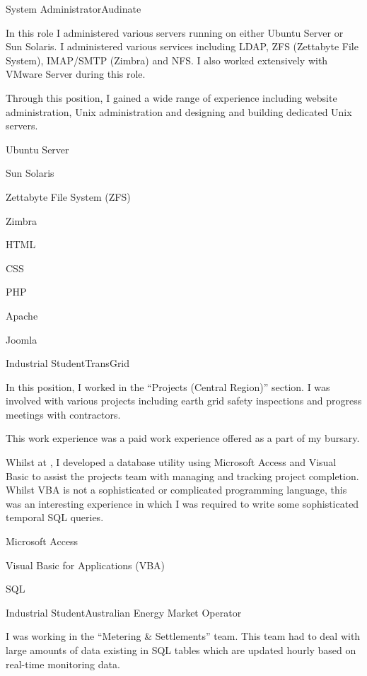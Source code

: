 \documentclass[10pt]{article}
\begin{document}
\begin{professionalExperience}
{System Administrator}{Audinate}
{In this role I administered various servers running on either Ubuntu Server or 
Sun Solaris. I administered various services including LDAP, ZFS (Zettabyte File
System), IMAP/SMTP (Zimbra) and NFS. I also worked extensively with VMware 
Server during this role.

Through this position, I gained a wide range of experience including website
administration, Unix administration and designing and building dedicated Unix
servers.}
{\item Ubuntu Server
\item Sun Solaris
\item Zettabyte File System (ZFS)
\item Zimbra
\item HTML
\item CSS
\item PHP
\item Apache
\item Joomla}

{Industrial Student}{TransGrid}
{In this position, I worked in the ``Projects (Central Region)'' section. I was 
involved with various projects including earth grid safety inspections and 
progress meetings with contractors.

This work experience was a paid work experience offered as a part of my 
 bursary.

Whilst at , I developed a database utility using 
Microsoft Access and Visual Basic to assist the projects team with managing and 
tracking project completion. Whilst VBA is not a sophisticated or complicated
programming language, this was an interesting experience in which I was required
to write some sophisticated temporal SQL queries.}
{\item Microsoft Access
\item Visual Basic for Applications (VBA)
\item SQL}

{Industrial Student}{Australian Energy Market Operator}
{I was working in the ``Metering \& Settlements'' team. This team had to deal 
with large amounts of data existing in SQL tables which are updated hourly based 
on real-time monitoring data.

}
\end{professionalExperience}
\end{document}
